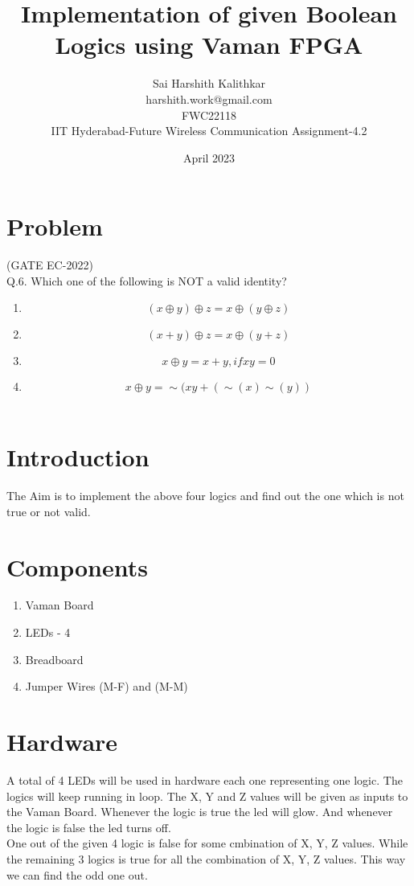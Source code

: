 \documentclass{article}
\title{Implementation of given Boolean Logics using Vaman FPGA}
\date{April 2023}
\author{Sai Harshith Kalithkar\\harshith.work@gmail.com\\FWC22118\\IIT Hyderabad-Future Wireless Communication Assignment-4.2}
\begin{document}
\maketitle
	\tableofcontents
\pagebreak
\section{Problem}
	(GATE EC-2022)\\
	Q.6. Which one of the following is NOT a valid identity?
\\

\begin{enumerate}
	\item \begin{equation} (x \oplus y) \oplus z = x \oplus (y \oplus z) \end{equation}
	\item \begin{equation} (x + y) \oplus z = x \oplus (y + z) \end{equation}
	\item \begin{equation} x \oplus y = x + y, if xy = 0  \end{equation}
		\item \begin{equation} x \oplus y = \sim(xy + (\sim(x) \sim(y)) \end{equation} \\
\end{enumerate}

\section{Introduction}
		The Aim is to implement the above four logics and find out the one which is not true or not valid.\\
\section{Components}
	\begin{enumerate}
		\item Vaman Board
		\item LEDs - 4
		\item Breadboard
		\item Jumper Wires (M-F) and (M-M) \\
	\end{enumerate}

\section{Hardware}
	A total of 4 LEDs will be used in hardware each one representing one logic. The logics will keep running in loop. The X, Y and Z values will be given as inputs to the Vaman Board. Whenever the logic is true the led will glow. And whenever the logic is false the led turns off. \\
	One out of the given 4 logic is false for some cmbination of X, Y, Z values. While the remaining 3 logics is true for all the combination of X, Y, Z values. This way we can find the odd one out. \\
\end{document}
